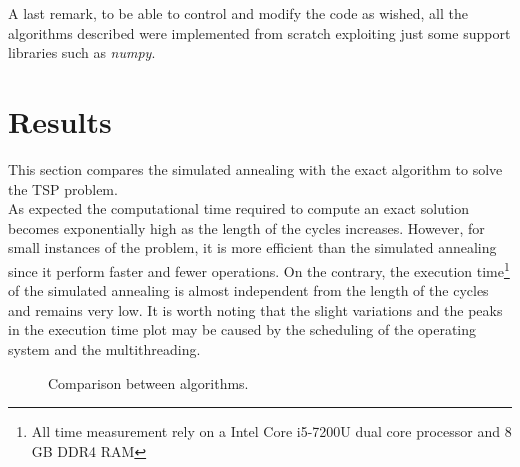\documentclass{article}
\begin{document}
\noindent A last remark, to be able to control and modify the code as wished, all the algorithms described were implemented from scratch exploiting just some support libraries such as \textit{numpy}.

\section{Results}
This section compares the simulated annealing with the exact algorithm to solve the TSP problem. \\
As expected the computational time required to compute an exact solution becomes exponentially high as the length of the cycles increases. However, for small instances of the problem, it is more efficient than the simulated annealing since it perform faster and fewer operations. On the contrary, the execution time\footnote{All time measurement rely on a Intel Core i5-7200U dual core processor and 8 GB DDR4 RAM} of the simulated annealing is almost independent from the length of the cycles and remains very low. It is worth noting that the slight variations and the peaks in the execution time plot may be caused by the scheduling of the operating system and the multithreading.
\begin{figure}[H]
\begin{adjustwidth}{-4em}{-4em}

     \hfill
     
     \caption{Comparison between algorithms.}
    \end{adjustwidth}
   \end{figure}
 
\end{document}
